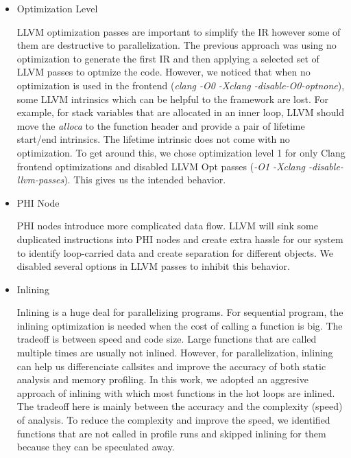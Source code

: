 \begin{itemize}
\item Optimization Level

LLVM optimization passes are important to simplify the IR however some of
them are destructive to parallelization. The previous approach was using no
optimization to generate the first IR and then applying a selected set of
LLVM passes to optmize the code. However, we noticed that when no
optimization is used in the frontend (\textit{clang -O0 -Xclang
-disable-O0-optnone}), some LLVM intrinsics which can be helpful to the
framework are lost. For example, for stack variables that are allocated in
an inner loop, LLVM should move the \textit{alloca} to the function header
and provide a pair of lifetime start/end intrinsics. The lifetime intrinsic
does not come with no optimization. To get around this, we chose
optimization level 1 for only Clang frontend optimizations and disabled LLVM
Opt passes (\textit{-O1 -Xclang -disable-llvm-passes}). This gives us the
intended behavior.


\item PHI Node

PHI nodes introduce more complicated data flow. LLVM will sink some
duplicated instructions into PHI nodes and create extra hassle for our
system to identify loop-carried data and create separation for different
objects. We disabled several options in LLVM passes to inhibit this
behavior.

\item Inlining

Inlining is a huge deal for parallelizing programs. For sequential program,
the inlining optimization is needed when the cost of calling a function is
big. The tradeoff is between speed and code size. Large functions that are
called multiple times are usually not inlined. However, for parallelization,
inlining can help us differenciate callsites and improve the accuracy of
both static analysis and memory profiling. In this work, we adopted an
aggresive approach of inlining with which most functions in the hot loops
are inlined. The tradeoff here is mainly between the accuracy and the
complexity (speed) of analysis. To reduce the complexity and improve the
speed, we identified functions that are not called in profile runs and
skipped inlining for them because they can be speculated away.

\end{itemize}
